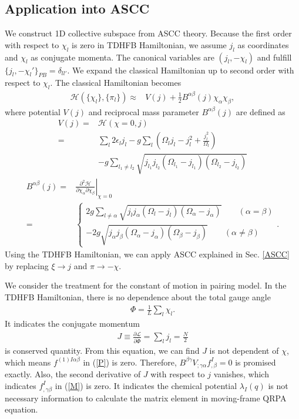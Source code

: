 \documentclass[%
superscriptaddress,
showpacs,
nofootinbib,
amsmath,amssymb,
aps,
prc,
twocolumn,
floatfix ]%
{revtex4-1}
\begin{document}
\subsection{Application into ASCC}
We construct 1D collective subspace from ASCC theory. Because the first order with respect to $\chi_l$ is zero in TDHFB Hamiltonian, we assume $j_l$ as coordinates and $\chi_l$ as conjugate momenta. The canonical variables are $(j_l,-\chi_l)$ and fulfill $\{j_l,-\chi_l'\}_{PB}=\delta_{ll'}$. We expand the classical Hamiltonian up to second order with respect to $\chi_l$. 
The classical Hamiltonian becomes
\begin{align}
  \mathcal{H}(\{\chi_l\},\{\pi_l\}) \approx& V(j) + \frac{1}{2}B^{\alpha\beta}(j)\chi_{\alpha}\chi_{\beta},
\end{align}
where potential $V(j)$ and reciprocal mass parameter $B^{\alpha\beta}(j)$ are defined as
\begin{align}
  V(j) =& \mathcal{H}(\chi=0,j) \nonumber \\
	=& \sum_l 2\epsilon_lj_l - g\sum_l \left( \Omega_lj_l - j_l^2 +\frac{j_l^2}{\Omega_l} \right) \nonumber \\
  &- g\sum_{l_1\ne l_2} \sqrt{j_{l_1}j_{l_2}(\Omega_{l_1}-j_{l_1})(\Omega_{l_2}-j_{l_2})} 	
\end{align}
\begin{align}
  B^{\alpha\beta}(j) =& \left. \frac{\partial^2\mathcal{H}}{\partial\chi_{\alpha}\partial\chi_{\beta}} \right|_{\chi=0} \nonumber \\
	=& \left\{
	\begin{array}{c}
	2g\sum_{l\ne \alpha} \sqrt{j_{l}j_{\alpha}(\Omega_{l}-j_{l})(\Omega_{\alpha}-j_{\alpha})} \hspace{2em} (\alpha=\beta) \\
	-2g\sqrt{j_{\alpha}j_{\beta}(\Omega_{\alpha}-j_{\alpha})(\Omega_{\beta}-j_{\beta})} \hspace{2em} (\alpha\ne\beta)
	\end{array}
	\right. .
 \label{mass}
\end{align}
Using the TDHFB Hamiltonian, we can apply ASCC explained in Sec. \ref{ASCC} by replacing $\xi\to j$ and $\pi\to-\chi$.

We consider the treatment for the constant of motion in pairing model. In the TDHFB Hamiltonian, there is no dependence about the total gauge angle
\begin{align}
  \Phi = \frac{1}{L}\sum_l \chi_l.
  \label{total_gauge}
\end{align}
It indicates the conjugate momentum 
\begin{align}
  J \equiv \frac{\partial\mathcal{L}}{\partial\dot{\Phi}}=\sum_l j_l = \frac{N}{2}
  \label{J}
\end{align}
is conserved quantity. From this equation, we can find $J$ is not dependent of $\chi$, which means $f^{(1)I\alpha\beta}$ in (\ref{P}) is zero. Therefore, $B^{\beta\gamma}V_{;\gamma\alpha}f^I_{,\beta}=0$ is promised exactly. Also, the second derivative of $J$ with respect to $j$ vanishes, which indicates $f^{I}_{,\gamma\beta}$ in (\ref{M}) is zero. It indicates the chemical potential $\lambda_I(q)$ is not necessary information to calculate the matrix element in moving-frame QRPA equation.
\end{document}
